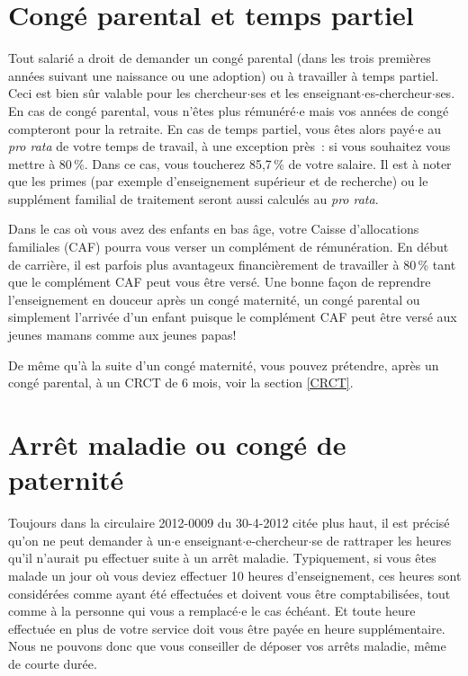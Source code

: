 \section{Cong\'e parental et temps partiel}

Tout salari\'e a droit de demander un cong\'e parental (dans les trois
premi\`eres ann\'ees suivant une naissance ou une adoption) ou \`a travailler \`a temps
partiel. Ceci est bien s\^ur valable pour les chercheur$\cdot$ses et les
enseignant$\cdot$es-chercheur$\cdot$ses. En cas de cong\'e parental, vous n'\^etes plus
r\'emun\'er\'e$\cdot$e mais vos ann\'ees de cong\'e compteront pour la
retraite. En cas de temps partiel, vous \^etes alors pay\'e$\cdot$e au {\em
pro rata} de votre temps de travail, \`a une exception pr\`es~: si
vous souhaitez vous mettre \`a 80\,\%. Dans ce cas, vous toucherez
85,7\,\% de votre salaire. Il est \`a noter que les primes (par exemple
d'enseignement sup\'erieur et de recherche) ou le suppl\'ement
familial de traitement seront aussi calcul\'es au {\em pro rata}.

Dans le cas o\`u vous avez des enfants en bas \^age, votre Caisse
d'allocations familiales (CAF) pourra vous verser un compl\'ement de r\'emun\'eration. En d\'ebut
de carri\`ere, il est parfois plus avantageux financi\`erement de travailler \`a
80\,\% tant que le compl\'ement CAF peut vous \^etre vers\'e. Une bonne fa\c con
de reprendre l'enseignement en douceur apr\`es un cong\'e maternit\'e, un cong\'e
parental ou simplement l'arriv\'ee d'un enfant puisque le compl\'ement CAF peut \^etre
vers\'e aux jeunes mamans comme aux jeunes papas!

De m\^eme qu'\`a la suite d'un cong\'e maternit\'e, vous pouvez pr\'etendre,
apr\`es un cong\'e parental, \`a un CRCT de 6 mois, voir la section \ref{CRCT}.

\section{Arr\^et maladie ou cong\'e de paternit\'e}

Toujours dans la circulaire 2012-0009 du 30-4-2012 cit\'ee plus haut, il est pr\'ecis\'e qu'on ne peut demander \`a un$\cdot$e
enseignant$\cdot$e-chercheur$\cdot$se de rattraper les heures qu'il n'aurait pu
effectuer suite \`a un arr\^et maladie. Typiquement, si vous \^etes
malade un jour o\`u vous deviez effectuer 10 heures d'enseignement,
ces heures sont consid\'er\'ees comme ayant \'et\'e effectu\'ees et
doivent vous \^etre comptabilis\'ees, tout comme \`a la personne qui
vous a remplac\'e$\cdot$e le cas \'ech\'eant. Et toute heure effectu\'ee en
plus de votre service doit vous \^etre pay\'ee en heure
suppl\'ementaire. Nous ne pouvons donc que vous conseiller de
d\'eposer vos arr\^ets maladie, m\^eme de courte dur\'ee.

